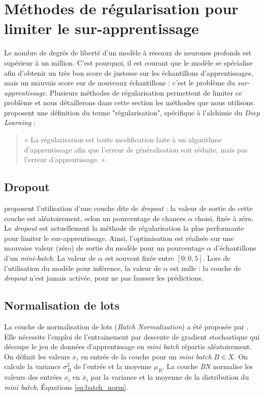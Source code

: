 \section{Méthodes de régularisation pour limiter le sur-apprentissage}
Le nombre de degrés de liberté d'un modèle à réseaux de neurones profonds est supérieur à un million.
C'est pourquoi, il est courant que le modèle se spécialise afin d'obtenir un très bon score de justesse sur les échantillons d'apprentissages, mais un mauvais score sur de nouveaux échantillons : c'est le problème du \emph{sur-apprentissage}.
Plusieurs méthodes de régularisation permettent de limiter ce problème et nous détaillerons dans cette section les méthodes que nous utilisons.
\citeauthor{goodfellow_deep_2016} proposent une définition du terme "régularisation", spécifique à l'alchimie du \textit{Deep Learning} \cite{goodfellow_deep_2016} :
\begin{quote}
	« La régularisation est toute modification faite à un algorithme d'apprentissage afin que l'erreur de généralisation soit réduite, mais pas l'erreur d'apprentissage. »
\end{quote}

\subsection{Dropout} \label{parag:dropout}
\citeauthor{srivastava_dropout_2014} \cite{srivastava_dropout_2014} proposent l'utilisation d'une couche dite de \textit{dropout} : la valeur de sortie de cette couche est aléatoirement, selon un pourcentage de chances $\alpha$ choisi, fixée à zéro. Le \textit{dropout} est actuellement la méthode de régularisation la plus performante pour limiter le sur-apprentissage.
Ainsi, l'optimisation est réalisée sur une mauvaise valeur (zéro) de sortie du modèle pour un pourcentage $\alpha$ d'échantillons d'un \textit{mini-batch}.
La valeur de $\alpha$ est souvent fixée entre $[0 ; 0,5]$.
Lors de l'utilisation du modèle pour inférence, la valeur de $\alpha$ est nulle : la couche de \textit{dropout} n'est jamais activée, pour ne pas fausser les prédictions.

\subsection{Normalisation de lots} \label{parag:batchnorm}
La couche de normalisation de lots (\textit{Batch Normalization}) a été proposée par \citeauthor{ioffe_batch_2015} \cite{ioffe_batch_2015}.
Elle nécessite l'emploi de l'entrainement par descente de gradient stochastique qui découpe le jeu de données d'apprentissage en \textit{mini batch} répartis aléatoirement.
On définit les valeurs $x_i$ en entrée de la couche pour un \textit{mini batch} $B \in X$.
On calcule la variance $\sigma_B^2$ de l'entrée et la moyenne $\mu_B$.
La couche \textit{BN} normalise les valeurs des entrées $x_i$ en $\bar{x}_{i}$ par la variance et la moyenne de la distribution du \textit{mini batch}, Équations \ref{eq:batch_norm}.

